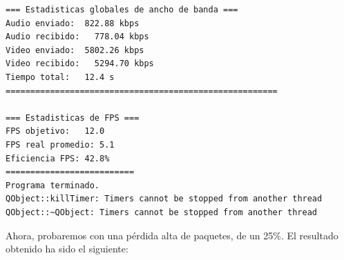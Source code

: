 \begin{adjustbox}{max width=\textwidth}
\begin{lstlisting}[language=bash,basicstyle=\ttfamily\scriptsize]
=== Estadisticas globales de ancho de banda ===
Audio enviado:	822.88 kbps
Audio recibido:   778.04 kbps
Video enviado:	5802.26 kbps
Video recibido:   5294.70 kbps
Tiempo total: 	12.4 s
=======================================================

=== Estadisticas de FPS ===
FPS objetivo: 	12.0
FPS real promedio: 5.1
Eficiencia FPS:	42.8%
==========================
Programa terminado.
QObject::killTimer: Timers cannot be stopped from another thread
QObject::~QObject: Timers cannot be stopped from another thread
\end{lstlisting}
\end{adjustbox}
\vspace{\baselineskip}

\newpage

Ahora, probaremos con una pérdida alta de paquetes, de un 25\%. El resultado obtenido ha sido el siguiente:
\vspace{\baselineskip}

